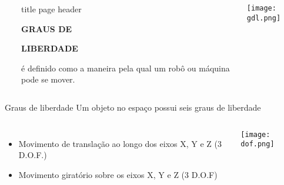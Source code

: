 \begin{frame}
    \begin{columns}
        ~\hfill
            \begin{beamercolorbox}[sep=8em, colsep*=18pt, wd=\textwidth,ht=\paperheight]{title page header}
                \begin{center}
                    \textbf{\huge{GRAUS DE}}\par
                    \vspace*{0.3cm}
                    \textbf{\huge{LIBERDADE}}\par
                    \vspace*{0.3cm}
                    é definido como a maneira pela qual um robô ou máquina pode se mover.
                \end{center}
            \end{beamercolorbox}%
        \begin{center}
            \texttt{[image: gdl.png]}
        \end{center}
            
    \end{columns}
  
 \end{frame}
\begin{frame}[c]{Graus de liberdade}
    Um objeto no espaço possui seis graus de liberdade
    \begin{columns}
        \begin{itemize}
            \item Movimento de translação ao longo dos eixos X, Y e Z (3 D.O.F.)
            \item Movimento giratório sobre os eixos X, Y e Z (3 D.O.F)    
        \end{itemize}
            \centering
            \texttt{[image: dof.png]}
    \end{columns}
\end{frame}
